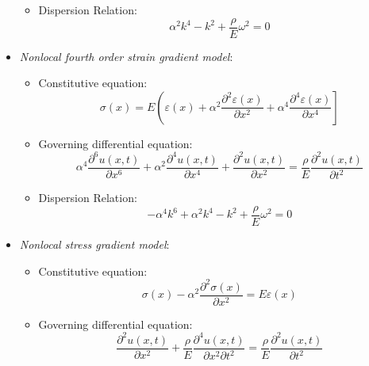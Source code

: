 \begin{itemize}
\begin{itemize}
	\item Dispersion Relation:\\
	\begin{equation}
	\alpha^2 k^4 - k^2 + \frac{\rho}{E} \omega^2 = 0
	\end{equation}
	\end{itemize}
\item \textit{Nonlocal fourth order strain gradient model}:\\
	\begin{itemize}
	\item Constitutive equation:\\
	\begin{equation}
		\sigma(x) = E \left( \varepsilon(x) + \alpha^2 \dfrac{\partial^2 \varepsilon(x)}{\partial x^2}+ \alpha^4 \dfrac{\partial^4 \varepsilon(x)}{\partial x^4} \right]
	\end{equation}
	\item Governing differential equation:\\
	\begin{equation}
	\alpha^4 \dfrac{\partial^6 u(x,t)}{\partial x^6} + \alpha^2 \dfrac{\partial^4 u(x,t)}{\partial x^4} + \dfrac{\partial^2 u(x,t)}{\partial x^2} = \dfrac{\rho}{E} \dfrac{\partial^2 u(x,t)}{\partial t^2}
	\end{equation}
	\item Dispersion Relation:\\
	\begin{equation}
	-\alpha^4 k^6 + \alpha^2 k^4 - k^2 + \frac{\rho}{E} \omega^2 = 0
	\end{equation}
	\end{itemize}
\item \textit{Nonlocal stress gradient model}:\\
	\begin{itemize}
	\item Constitutive equation:\\
	\begin{equation}
		\sigma(x) - \alpha^2 \dfrac{\partial^2 \sigma(x)}{\partial x^2} = E \varepsilon(x)
	\end{equation}
	\item Governing differential equation:\\
	\begin{equation}
	\dfrac{\partial^2 u(x,t)}{\partial x^2} + \dfrac{\rho}{E} \dfrac{\partial^4 u(x,t)}{\partial x^2 \partial t^2} = \dfrac{\rho}{E} \dfrac{\partial^2 u(x,t)}{\partial t^2}
	\end{equation}

\end{itemize}
\end{itemize}
